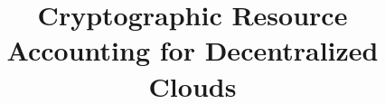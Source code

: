 \documentclass[10pt, conference]{IEEEtran}
\begin{document}
\title{Cryptographic Resource Accounting for Decentralized Clouds}

\maketitle

%       







%
%

%
\end{document}
